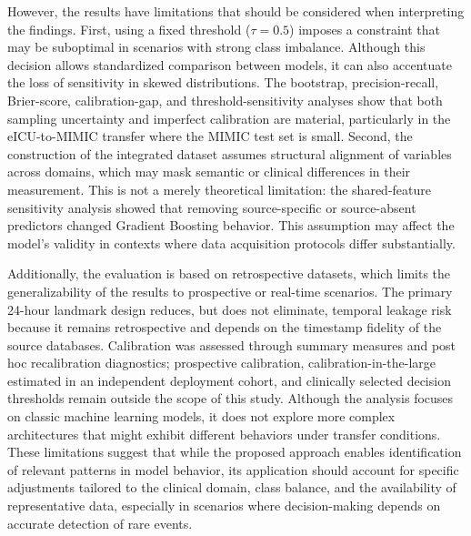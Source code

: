 \documentclass[utf8]{FrontiersinHarvard} %
\begin{document}
However, the results have limitations that should be considered when interpreting the findings. First, using a fixed threshold ($\tau = 0.5$) imposes a constraint that may be suboptimal in scenarios with strong class imbalance. Although this decision allows standardized comparison between models, it can also accentuate the loss of sensitivity in skewed distributions. The bootstrap, precision-recall, Brier-score, calibration-gap, and threshold-sensitivity analyses show that both sampling uncertainty and imperfect calibration are material, particularly in the eICU-to-MIMIC transfer where the MIMIC test set is small. Second, the construction of the integrated dataset assumes structural alignment of variables across domains, which may mask semantic or clinical differences in their measurement. This is not a merely theoretical limitation: the shared-feature sensitivity analysis showed that removing source-specific or source-absent predictors changed Gradient Boosting behavior. This assumption may affect the model's validity in contexts where data acquisition protocols differ substantially.

Additionally, the evaluation is based on retrospective datasets, which limits the generalizability of the results to prospective or real-time scenarios. The primary 24-hour landmark design reduces, but does not eliminate, temporal leakage risk because it remains retrospective and depends on the timestamp fidelity of the source databases. Calibration was assessed through summary measures and post hoc recalibration diagnostics; prospective calibration, calibration-in-the-large estimated in an independent deployment cohort, and clinically selected decision thresholds remain outside the scope of this study. Although the analysis focuses on classic machine learning models, it does not explore more complex architectures that might exhibit different behaviors under transfer conditions. These limitations suggest that while the proposed approach enables identification of relevant patterns in model behavior, its application should account for specific adjustments tailored to the clinical domain, class balance, and the availability of representative data, especially in scenarios where decision-making depends on accurate detection of rare events.
\end{document}
